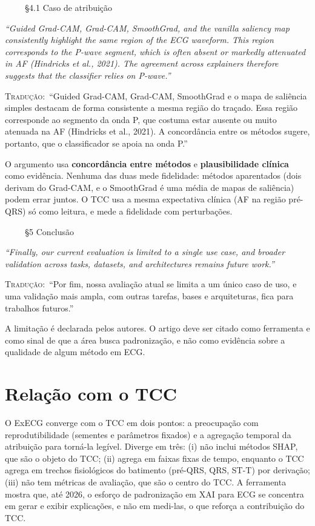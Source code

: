 \documentclass[11pt,a4paper]{article}
\newcommand{\pagechip}[1]{{\setlength{\fboxsep}{1.5pt}\colorbox{cAcc}{\textcolor{white}{\scriptsize\texttt{#1}}}}}
\newenvironment{origquote}{\par\itshape\small}{\par}
\newenvironment{tradquote}{\par\small\textsc{Tradução:}\ }{\par}
\newcommand{\explab}[1]{\par\smallskip{\small\color{cAcc}\textbf{\MakeUppercase{#1}}}\par}
\begin{document}
\begin{citacard}{\pagechip{p. 7} §4.1 Caso de atribuição}
\begin{origquote}“Guided Grad-CAM, Grad-CAM, SmoothGrad, and the vanilla saliency map consistently highlight the same region of the ECG waveform. This region corresponds to the P-wave segment, which is often absent or markedly attenuated in AF (Hindricks et al., 2021). The agreement across explainers therefore suggests that the classifier relies on P-wave.”\end{origquote}
\begin{tradquote}“Guided Grad-CAM, Grad-CAM, SmoothGrad e o mapa de saliência simples destacam de forma consistente a mesma região do traçado. Essa região corresponde ao segmento da onda P, que costuma estar ausente ou muito atenuada na AF (Hindricks et al., 2021). A concordância entre os métodos sugere, portanto, que o classificador se apoia na onda P.”\end{tradquote}
\explab{Explicação}
O argumento usa \textbf{concordância entre métodos} e \textbf{plausibilidade clínica} como evidência. Nenhuma das duas mede fidelidade: métodos aparentados (dois derivam do Grad-CAM, e o SmoothGrad é uma média de mapas de saliência) podem errar juntos. O TCC usa a mesma expectativa clínica (AF na região pré-QRS) só como leitura, e mede a fidelidade com perturbações.
\end{citacard}

\begin{citacard}{\pagechip{p. 7} §5 Conclusão}
\begin{origquote}“Finally, our current evaluation is limited to a single use case, and broader validation across tasks, datasets, and architectures remains future work.”\end{origquote}
\begin{tradquote}“Por fim, nossa avaliação atual se limita a um único caso de uso, e uma validação mais ampla, com outras tarefas, bases e arquiteturas, fica para trabalhos futuros.”\end{tradquote}
\explab{Explicação}
A limitação é declarada pelos autores. O artigo deve ser citado como ferramenta e como sinal de que a área busca padronização, e não como evidência sobre a qualidade de algum método em ECG.
\end{citacard}

\section{Relação com o TCC}
O ExECG converge com o TCC em dois pontos: a preocupação com reprodutibilidade (sementes e parâmetros fixados) e a agregação temporal da atribuição para torná-la legível. Diverge em três: (i) não inclui métodos SHAP, que são o objeto do TCC; (ii) agrega em faixas fixas de tempo, enquanto o TCC agrega em trechos fisiológicos do batimento (pré-QRS, QRS, ST-T) por derivação; (iii) não tem métricas de avaliação, que são o centro do TCC. A ferramenta mostra que, até 2026, o esforço de padronização em XAI para ECG se concentra em gerar e exibir explicações, e não em medi-las, o que reforça a contribuição do TCC.
\end{document}
